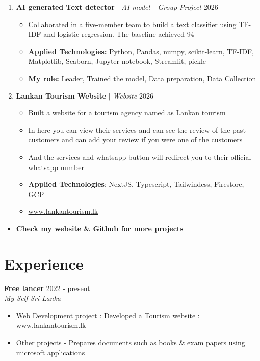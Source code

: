 \documentclass[10pt,a4paper]{article}
\newcommand{\cventry}[4]{%
  \textbf{#1} \hfill #2\\
  \textit{#3} \hfill \textit{#4}\vspace{1pt}}
\newcommand{\project}[3]{%
  \textbf{#1} $|$ \textit{#2} \hfill #3}
\begin{document}
\begin{enumerate}[resume]
  \item \project{AI generated Text detector}{AI model - Group Project}{2026}
  \begin{itemize}
    \item Collaborated in a five-member team to build a text classifier using TF-IDF and logistic regression. The baseline achieved 94%
    \item \textbf{Applied Technologies: }Python, Pandas, numpy, scikit-learn, TF-IDF, Matplotlib, Seaborn, Jupyter notebook, Streamlit, pickle
    \item \textbf{My role: }Leader, Trained the model, Data preparation, Data Collection
  \end{itemize}

   \item \project{Lankan Tourism Website}{Website}{2026}
   \begin{itemize}
    \item Built a website for a tourism agency named as Lankan tourism
    \item In here you can view their services and can see the review of the past customers and can add your review if you were one of the customers
    \item And the services and whatsapp button will redirect you to their official whatsapp number
    \item \textbf{Applied Technologies}: NextJS, Typescript, Tailwindcss, Firestore, GCP
    \item \faLink \href{https://lankantourism.lk}{ www.lankantourism.lk}
   \end{itemize}

\end{enumerate}
\begin{itemize}
  \item \textbf{Check my \href{https://armusharraf.me}{\textcolor{accent}{website}} \& \href{https://github.com/musharraf-Mac}{\textcolor{accent}{Github}} for more projects}
\end{itemize}

\section{Experience}
\cventry{Free lancer}{2022 - present}{My Self}{Sri Lanka}
\begin{itemize}
  \item Web Development project : Developed a Tourism website : www.lankantourism.lk
  \item Other projects - Prepares documents such as books \& exam papers using microsoft applications
\end{itemize}
\end{document}
